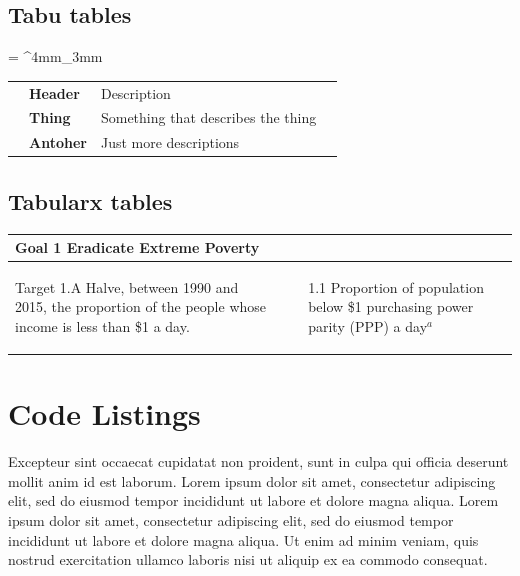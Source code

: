 \documentclass[10pt,conference,a4paper,onecolumn] {IEEEtran}
\newcommand{\tableHeaderStyle}{
    \rowfont{\leavevmode\color{white}\bfseries}
    \rowcolor{tableHeader}
}
\begin{document}
\begin{multicols}{2}
\subsection{Tabu tables}

\tabulinesep = ^4mm_3mm
\everyrow{\tabucline[.4mm  white]{}}

\begin{tabu}{l >{\bfseries}X[r, 1] X[4] l}
\tableHeaderStyle
& Header & Description & \\
& Thing & Something that describes the thing & \\
& Antoher & Just more descriptions & \\
\end{tabu}

\subsection{Tabularx tables}


\begin{tabularx}{0.46\textwidth}{XX}
\arrayrulecolor{delim}\hline
\textbf{\textcolor{delim}{Goal 1 Eradicate Extreme Poverty}} & \\
\hline
Target 1.A Halve, between 1990 and 2015, the proportion of the people whose income is less than \$1 a day. & 
\begin{minipage}[t]{\linewidth}%
\begin{itemize}
\item[1.1] Proportion of population below \$1 purchasing power parity (PPP) a day$^a$
\end{itemize} 
\end{minipage}\\
\end{tabularx}

\newpage
\section{Code Listings}
\label{Listings}


Excepteur sint occaecat cupidatat non proident, sunt in culpa qui officia deserunt mollit anim id est laborum. Lorem ipsum dolor sit amet, consectetur adipiscing elit, sed do eiusmod tempor incididunt ut labore et dolore magna aliqua. Lorem ipsum dolor sit amet, consectetur adipiscing elit, sed do eiusmod tempor incididunt ut labore et dolore magna aliqua. Ut enim ad minim veniam, quis nostrud exercitation ullamco laboris nisi ut aliquip ex ea commodo consequat. 


\end{multicols}
\end{document}
